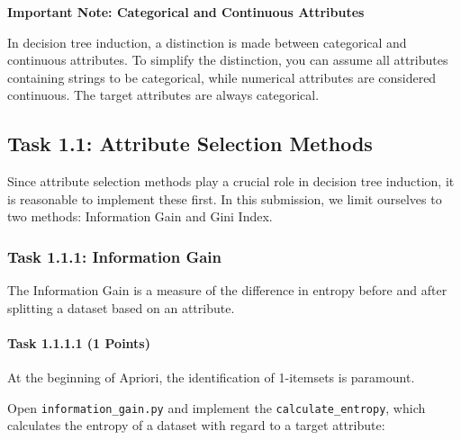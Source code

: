 \documentclass[
english,
smallborders
]{i6prcsht}
\newcommand{\points}[1]{\hfill \color{red}(#1 Points)\color{black}}
\begin{document}
\vspace*{1mm}

\begin{mdframed}
	\begin{em}
		\textbf{Important Note: Categorical and Continuous Attributes}
		
		In decision tree induction, a distinction is made between categorical and continuous attributes. To simplify the distinction, you can assume all attributes containing strings to be categorical, while numerical attributes are considered continuous. The target attributes are always categorical.
	\end{em}
\end{mdframed}

\subsection*{Task 1.1: Attribute Selection Methods}

Since attribute selection methods play a crucial role in decision tree induction, it is reasonable to implement these first. In this submission, we limit ourselves to two methods: Information Gain and Gini Index.

\subsubsection*{Task 1.1.1: Information Gain}

The Information Gain is a measure of the difference in entropy before and after splitting a dataset based on an attribute.

\paragraph*{Task 1.1.1.1 \points{1}} \hfill

At the beginning of Apriori, the identification of 1-itemsets is paramount.

Open \texttt{information\_gain.py} and implement the \texttt{calculate\_entropy}, which calculates the entropy of a dataset with regard to a target attribute:

\vspace*{0.3cm}
\end{document}
